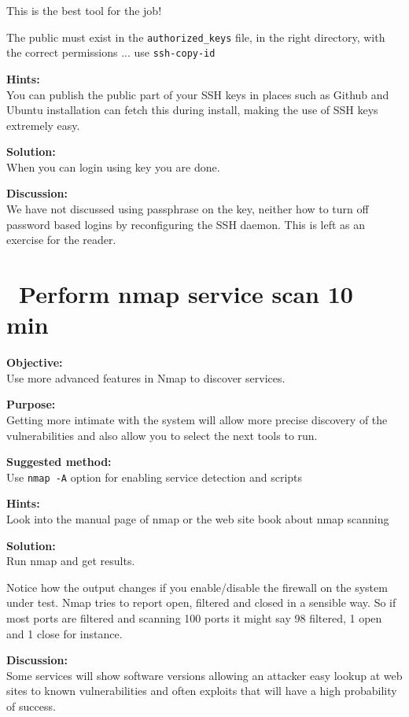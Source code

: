 \documentclass[a4paper,11pt,notitlepage]{report}
\begin{document}
\centerline{This is the best tool for the job!}

The public must exist in the \verb+authorized_keys+ file, in the right directory, with the correct permissions ... use \verb+ssh-copy-id+

{\bf Hints:}\\
You can publish the public part of your SSH keys in places such as Github and Ubuntu installation can fetch this during install, making the use of SSH keys extremely easy.

{\bf Solution:}\\
When you can login using key you are done.

{\bf Discussion:}\\
We have not discussed using passphrase on the key, neither how to turn off password based logins by reconfiguring the SSH daemon. This is left as an exercise for the reader.




\chapter{\faExclamationTriangle\ Perform nmap service scan 10 min}
\label{ex:nmap-service}

{\bf Objective:} \\
Use more advanced features in Nmap to discover services.

{\bf Purpose:}\\
Getting more intimate with the system will allow more precise discovery of the vulnerabilities and also allow you to select the next tools to run.

{\bf Suggested method:}\\
Use \verb+nmap -A+ option for enabling service detection and scripts

{\bf Hints:} \\
Look into the manual page of nmap or the web site book about nmap scanning

{\bf Solution:}\\
Run nmap and get results.

Notice how the output changes if you enable/disable the firewall on the system under test. Nmap tries to report open, filtered and closed in a sensible way. So if most ports are filtered and scanning 100 ports it might say 98 filtered, 1 open and 1 close for instance.

{\bf Discussion:}\\
Some services will show software versions allowing an attacker easy lookup at web sites to known vulnerabilities and often exploits that will have a high probability of success.
\end{document}
